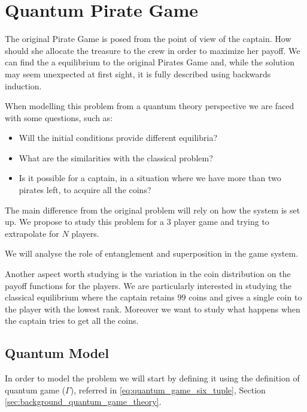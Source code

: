 \clearpage
\section{Quantum Pirate Game}
\label{sec:quantum_pirate}

The original Pirate Game is posed from the point of view of the captain. How should she allocate the treasure to the crew in order to maximize her payoff.
We can find the a equilibrium to the original Pirates Game and, while the solution may seem unexpected at first sight, it is fully described using backwards induction. 

When modelling this problem from a quantum theory perspective we are faced with some questions, such as:

\begin{itemize}
\item Will the initial conditions provide different equilibria? 

\item What are the similarities with the classical problem? 

\item Is it possible for a captain, in a situation where we have more than two pirates left, to acquire all the coins?

\end{itemize} 

The main difference from the original problem will rely on how the system is set up. 
We propose to study this problem for a $3$ player game and trying to extrapolate for $N$ players. 

We will analyse the role of entanglement and superposition in the game system. 

Another aspect worth studying is the variation in the coin distribution on the payoff functions for the players. We are particularly interested in studying the classical equilibrium where the captain retains $99$ coins and gives a single coin to the player with the lowest rank. Moreover we want to study what happens when the captain tries to get all the coins.



\subsection{Quantum Model}
\label{subsec:description_2}

In order to model the problem we will start by defining it using the definition of quantum game ($\Gamma$), referred in \ref{eq:quantum_game_six_tuple}, Section \ref{sec:background_quantum_game_theory}\cite{Fra2011a}.


